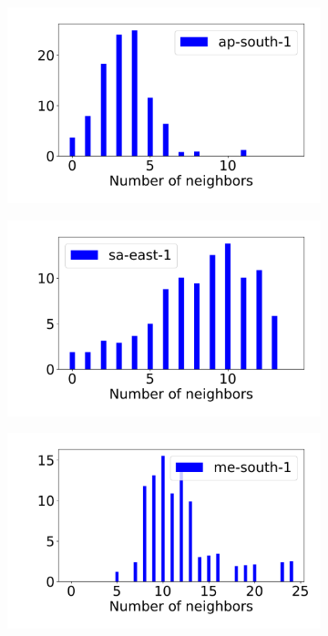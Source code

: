 \begin{figure}[!t]
  \begin{subfigure}{.33\textwidth}
    \centering
    \includegraphics[width=.99\linewidth]{fig/colocation-ap-south-1.pdf}
  \end{subfigure}%
  \begin{subfigure}{.33\textwidth}
    \centering
    \includegraphics[width=.99\linewidth]{fig/colocation-sa-east-1.pdf}
  \end{subfigure}
  \begin{subfigure}{.33\textwidth}
    \centering
    \includegraphics[width=.99\linewidth]{fig/colocation-me-south-1.pdf}

\end{subfigure}
\end{figure}
